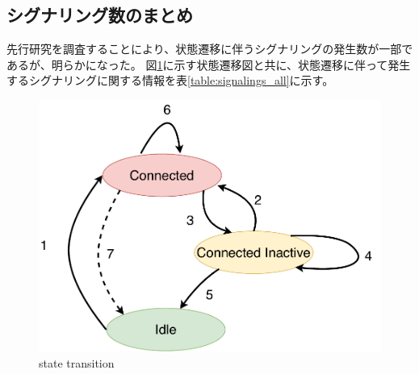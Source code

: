 \documentclass[a4j]{ujarticle}
\begin{document}
%
%
%

\clearpage
\subsection{シグナリング数のまとめ}
先行研究を調査することにより、状態遷移に伴うシグナリングの発生数が一部であるが、明らかになった。
図\ref{state_id}に示す状態遷移図と共に、状態遷移に伴って発生するシグナリングに関する情報を表\ref{table:signalings_all}に示す。

\begin{figure}[htbp]
  \centering
  \includegraphics[width=0.9\hsize]{state_id.pdf}
  \caption{state transition}
  \label{state_id}
\end{figure}
\end{document}
